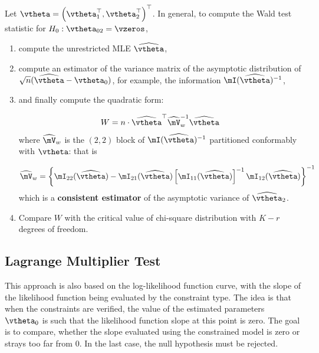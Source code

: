 \documentclass[english,12pt]{book}\usepackage[]{graphicx}\usepackage[]{xcolor}
\begin{document}
\begin{algorithm}
Let $\vtheta = \left(\vtheta_1^\top, \vtheta_2^\top\right)^\top$. In general, to compute the Wald test statistic for $H_0: \vtheta_{02} = \vzeros$, 

\begin{enumerate}
  \item compute the unrestricted MLE $\widehat{\vtheta}$, 
  \item compute an estimator of the variance matrix of the asymptotic distribution of $\sqrt{n}(\widehat{\vtheta} - \vtheta_0)$, for example, the information $\mI(\widehat{\vtheta})^{-1}$, 
  \item and finally compute the quadratic form:
  
  \begin{equation}
    W = n \cdot \widehat{\vtheta}^\top\widehat{\mV}_w^{-1}\widehat{\vtheta}
  \end{equation}
%
where $\widehat{\mV}_{w}$ is the $(2, 2)$ block of $\mI(\widehat{\vtheta})^{-1}$ partitioned conformably with $\vtheta$: that is

\begin{equation}
\widehat{\mV}_{w} = \left\lbrace \mI_{22}(\widehat{\vtheta}) - \mI_{21}(\widehat{\vtheta})\left[\mI_{11}(\widehat{\vtheta})\right]^{-1}\mI_{12}(\widehat{\vtheta})\right\rbrace^{-1}
\end{equation}
%
which is a \textbf{consistent estimator} of the asymptotic variance of $\widehat{\vtheta}_2$.

\item Compare $W$ with the critical value of chi-square distribution with $K - r$ degrees of freedom. 
\end{enumerate}
\end{algorithm}

\subsection{Lagrange Multiplier Test}

This approach is also based on the log-likelihood function curve, with the slope of the likelihood function being evaluated by the constraint type. The idea is that when the constraints are verified, the value of the estimated parameters $\vtheta_0$ is such that the likelihood function slope at this point is zero. The goal is to compare, whether the slope evaluated using the constrained model is zero or strays too far from 0. In the last case, the null hypothesis must be rejected. 
\end{document}
